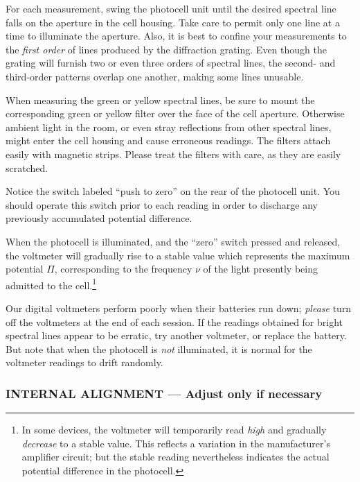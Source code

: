 For each measurement, swing the photocell unit until the desired
spectral line falls on the aperture in the cell housing. Take care to
permit only one line at a time to illuminate the aperture. Also, it is
best to confine your measurements to the \emph{first order} of lines
produced by the diffraction grating. Even though the grating will
furnish two or even three orders of spectral lines, the second- and
third-order patterns overlap one another, making some lines unusable.

When measuring the green or yellow spectral lines, be sure to mount the
corresponding green or yellow filter over the face of the cell aperture.
Otherwise ambient light in the room, or even stray reflections from
other spectral lines, might enter the cell housing and cause erroneous
readings. The filters attach easily with magnetic strips. Please treat
the filters with care, as they are easily scratched.

Notice the switch labeled ``push to zero'' on the rear of the photocell
unit. You should operate this switch prior to each reading in order to
discharge any previously accumulated potential difference.

When the photocell is illuminated, and the ``zero'' switch pressed and
released, the voltmeter will gradually rise to a stable value which
represents the maximum potential $\Pi$, corresponding to the
frequency $\nu$ of the light presently being admitted to the
cell.\footnote{In some devices, the voltmeter will temporarily read
  \emph{high} and gradually \emph{decrease} to a stable value. This
  reflects a variation in the manufacturer's amplifier circuit; but the
  stable reading nevertheless indicates the actual potential difference
  in the photocell.}

Our digital voltmeters perform poorly when their batteries run down;
\emph{please} turn off the voltmeters at the end of each session. If the
readings obtained for bright spectral lines appear to be erratic, try
another voltmeter, or replace the battery. But note that when the
photocell is \emph{not} illuminated, it is normal for the voltmeter
readings to drift randomly.

\subsubsection*{INTERNAL ALIGNMENT --- Adjust only if necessary}

